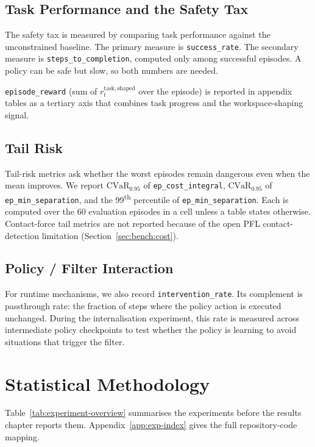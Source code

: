 \documentclass[11pt,a4paper]{report}
\newcommand{\pfl}{PFL}
\newcommand{\cvar}{\ensuremath{\mathrm{CVaR}}}
\begin{document}
\subsection{Task Performance and the Safety Tax}
\label{sec:setup:metrics:task}

The safety tax is measured by comparing task performance against the
unconstrained baseline. The primary measure is
\texttt{success\_rate}. The secondary measure is
\texttt{steps\_to\_completion}, computed only among successful
episodes. A policy can be safe but slow, so both numbers are needed.

\texttt{episode\_reward} (sum of $r^{\mathrm{task,shaped}}_t$ over
the episode) is reported in appendix tables as a tertiary axis
that combines task progress and the workspace-shaping signal.

\subsection{Tail Risk}
\label{sec:setup:metrics:tail}

Tail-risk metrics ask whether the worst episodes remain dangerous even
when the mean improves. We report $\cvar_{0.95}$ of
\texttt{ep\_cost\_integral}, $\cvar_{0.95}$ of
\texttt{ep\_min\_separation}, and the 99\textsuperscript{th}
percentile of \texttt{ep\_min\_separation}. Each is computed over the
60 evaluation episodes in a cell unless a table states otherwise.
Contact-force tail metrics are not reported because of the open \pfl{}
contact-detection limitation (Section~\ref{sec:bench:cost}).

\subsection{Policy / Filter Interaction}
\label{sec:setup:metrics:interaction}

For runtime mechanisms, we also record \texttt{intervention\_rate}.
Its complement is passthrough rate: the fraction of steps where the
policy action is executed unchanged. During the internalisation
experiment, this rate is measured across intermediate policy
checkpoints to test whether the policy is learning to avoid situations
that trigger the filter.

\section{Statistical Methodology}
\label{sec:setup:stats}

Table~\ref{tab:experiment-overview} summarises the experiments before
the results chapter reports them. Appendix~\ref{app:exp-index} gives
the full repository-code mapping.
\end{document}
